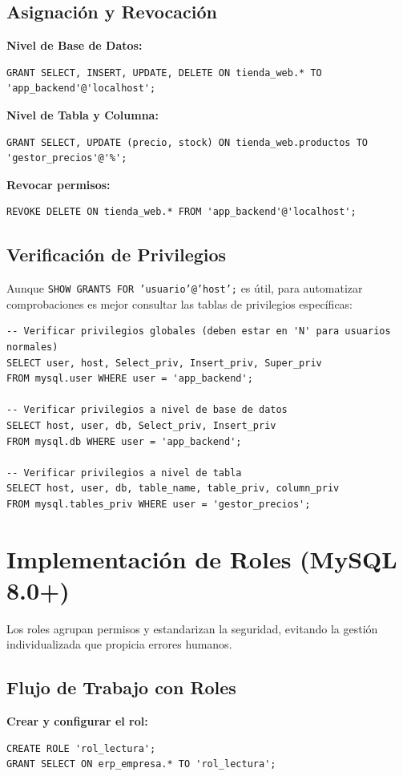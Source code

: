 \documentclass[12pt,a4paper]{article}
\begin{document}
\subsection{Asignación y Revocación}
\textbf{Nivel de Base de Datos:}
\begin{lstlisting}
GRANT SELECT, INSERT, UPDATE, DELETE ON tienda_web.* TO 'app_backend'@'localhost';
\end{lstlisting}

\textbf{Nivel de Tabla y Columna:}
\begin{lstlisting}
GRANT SELECT, UPDATE (precio, stock) ON tienda_web.productos TO 'gestor_precios'@'%';
\end{lstlisting}

\textbf{Revocar permisos:}
\begin{lstlisting}
REVOKE DELETE ON tienda_web.* FROM 'app_backend'@'localhost';
\end{lstlisting}

\subsection*{ Verificación de Privilegios}
Aunque \texttt{SHOW GRANTS FOR 'usuario'@'host';} es útil, para automatizar comprobaciones es mejor consultar las tablas de privilegios específicas:

\begin{lstlisting}
-- Verificar privilegios globales (deben estar en 'N' para usuarios normales)
SELECT user, host, Select_priv, Insert_priv, Super_priv
FROM mysql.user WHERE user = 'app_backend';

-- Verificar privilegios a nivel de base de datos
SELECT host, user, db, Select_priv, Insert_priv
FROM mysql.db WHERE user = 'app_backend';

-- Verificar privilegios a nivel de tabla
SELECT host, user, db, table_name, table_priv, column_priv
FROM mysql.tables_priv WHERE user = 'gestor_precios';
\end{lstlisting}

\section{Implementación de Roles (MySQL 8.0+)}
Los roles agrupan permisos y estandarizan la seguridad, evitando la gestión individualizada que propicia errores humanos.

\subsection{Flujo de Trabajo con Roles}
\textbf{Crear y configurar el rol:}
\begin{lstlisting}
CREATE ROLE 'rol_lectura';
GRANT SELECT ON erp_empresa.* TO 'rol_lectura';
\end{lstlisting}
\end{document}
